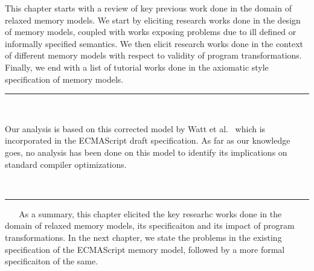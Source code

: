 This chapter starts with a review of key previous work done in the domain of relaxed memory models.
We start by eliciting research works done in the design of memory models, coupled with works exposing problems due to ill defined or informally specified semantics. 
We then elicit research works done in the context of different memory models with respect to validity of program transformations. 
Finally, we end with a list of tutorial works done in the axiomatic style specification of memory models.
\ \newline
\ \newline  
\hrule 
\ \newline 
\ \newline 






  
   
   Our analysis is based on this corrected model by Watt et al.~\cite{WattC} which is incorporated in the ECMAScript draft specification. As far as our knowledge goes, no analysis has been done on this model to identify its implications on standard compiler optimizations. 

\ \newline
\ \newline  
\hrule 
\ \newline 
\ \newline 
As a summary, this chapter elicited the key researhc works done in the domain of relaxed memory models, its specificaiton and its impact of program transformations. 
In the next chapter, we state the problems in the existing specification of the ECMAScript memory model, followed by a more formal specificaiton of the same.